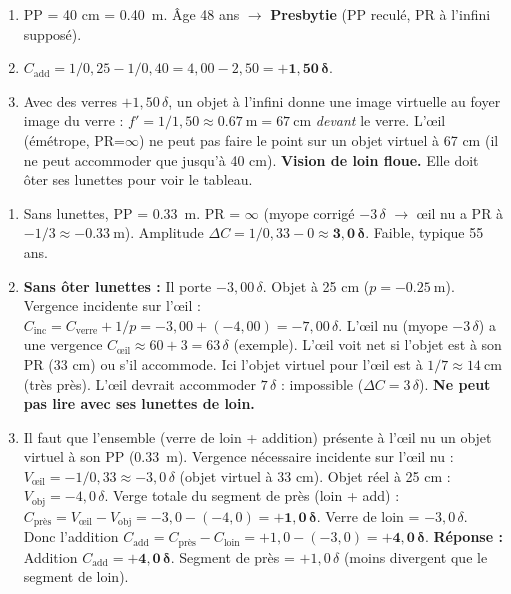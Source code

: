 \documentclass[11pt]{article}
\begin{document}
\begin{corrige}[Exercice 1]
\begin{enumerate}
    \item PP = 40 cm = \SI{0,40}{\meter}. Âge 48 ans $\rightarrow$ \textbf{Presbytie} (PP reculé, PR à l'infini supposé).
    \item $C_{\text{add}} = 1/0,25 - 1/0,40 = 4,00 - 2,50 = \mathbf{+1,50\,\delta}$.
    \item Avec des verres $+1,50\,\delta$, un objet à l'infini donne une image virtuelle au foyer image du verre : $f' = 1/1,50 \approx \SI{0,67}{\meter} = \SI{67}{\centi\meter}$ \emph{devant} le verre. L'œil (émétrope, PR=$\infty$) ne peut pas faire le point sur un objet virtuel à 67 cm (il ne peut accommoder que jusqu'à 40 cm). \textbf{Vision de loin floue.} Elle doit ôter ses lunettes pour voir le tableau.
\end{enumerate}
\end{corrige}

\begin{corrige}[Exercice 2]
\begin{enumerate}
    \item Sans lunettes, PP = \SI{0,33}{\meter}. PR = $\infty$ (myope corrigé $-3\,\delta$ $\rightarrow$ œil nu a PR à $-1/3 \approx -\SI{0,33}{\meter}$). Amplitude $\Delta C = 1/0,33 - 0 \approx \mathbf{3,0\,\delta}$. Faible, typique 55 ans.
    \item \textbf{Sans ôter lunettes :} Il porte $-3,00\,\delta$. Objet à 25 cm ($p = -\SI{0,25}{\meter}$). Vergence incidente sur l'œil : $C_{\text{inc}} = C_{\text{verre}} + 1/p = -3,00 + (-4,00) = -7,00\,\delta$. L'œil nu (myope $-3\,\delta$) a une vergence $C_{\text{œil}} \approx 60+3=63\,\delta$ (exemple). L'œil voit net si l'objet est à son PR (33 cm) ou s'il accommode. Ici l'objet virtuel pour l'œil est à $1/7 \approx \SI{14}{\centi\meter}$ (très près). L'œil devrait accommoder $7\,\delta$ : impossible ($\Delta C = 3\,\delta$). \textbf{Ne peut pas lire avec ses lunettes de loin.}
    \item Il faut que l'ensemble (verre de loin + addition) présente à l'œil nu un objet virtuel à son PP (\SI{0,33}{\meter}).
    Vergence nécessaire incidente sur l'œil nu : $V_{\text{œil}} = -1/0,33 \approx -3,0\,\delta$ (objet virtuel à 33 cm).
    Objet réel à 25 cm : $V_{\text{obj}} = -4,0\,\delta$.
    Verge totale du segment de près (loin + add) : $C_{\text{près}} = V_{\text{œil}} - V_{\text{obj}} = -3,0 - (-4,0) = \mathbf{+1,0\,\delta}$.
    Verre de loin = $-3,0\,\delta$. Donc l'addition $C_{\text{add}} = C_{\text{près}} - C_{\text{loin}} = +1,0 - (-3,0) = \mathbf{+4,0\,\delta}$.
    \textbf{Réponse :} Addition $C_{\text{add}} = \mathbf{+4,0\,\delta}$. Segment de près = $+1,0\,\delta$ (moins divergent que le segment de loin).
\end{enumerate}
\end{corrige}
\end{document}
